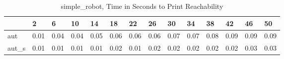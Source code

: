 \begin{table}
\caption{simple_robot, Time in Seconds to Print Reachability}
\label{simple_robot_states_time}
\begin{tabular}{llllllllllllll}
\toprule
 & 2 & 6 & 10 & 14 & 18 & 22 & 26 & 30 & 34 & 38 & 42 & 46 & 50 \\
\midrule
aut & 0.01 & 0.04 & 0.04 & 0.05 & 0.06 & 0.06 & 0.06 & 0.07 & 0.07 & 0.08 & 0.09 & 0.09 & 0.09 \\
aut_s & 0.01 & 0.01 & 0.01 & 0.01 & 0.02 & 0.01 & 0.02 & 0.02 & 0.02 & 0.02 & 0.02 & 0.03 & 0.03 \\
\bottomrule
\end{tabular}
\end{table}
